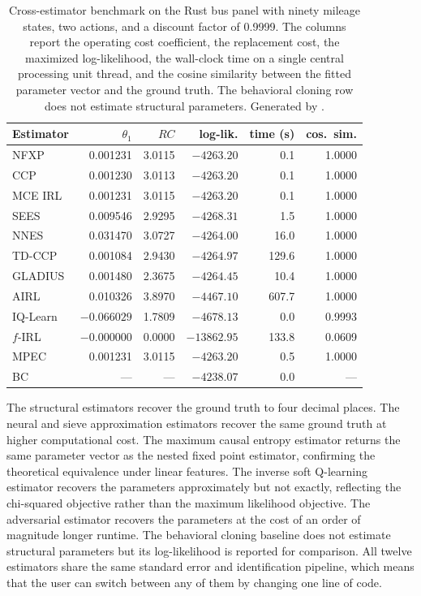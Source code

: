 \begin{table}[t]
\centering
\small
\begin{tabular}{lrrrrr}
\toprule
Estimator & $\theta_1$ & $RC$ & log-lik. & time (s) & cos.\ sim. \\
\midrule
NFXP    & 0.001231 & 3.0115 & $-4263.20$ &   0.1 & 1.0000 \\
CCP     & 0.001230 & 3.0113 & $-4263.20$ &   0.1 & 1.0000 \\
MCE IRL & 0.001231 & 3.0115 & $-4263.20$ &   0.1 & 1.0000 \\
SEES    & 0.009546 & 2.9295 & $-4268.31$ &   1.5 & 1.0000 \\
NNES    & 0.031470 & 3.0727 & $-4264.00$ &  16.0 & 1.0000 \\
TD-CCP  & 0.001084 & 2.9430 & $-4264.97$ & 129.6 & 1.0000 \\
GLADIUS & 0.001480 & 2.3675 & $-4264.45$ &  10.4 & 1.0000 \\
AIRL    & 0.010326 & 3.8970 & $-4467.10$ & 607.7 & 1.0000 \\
IQ-Learn& $-0.066029$ & 1.7809 & $-4678.13$ & 0.0 & 0.9993 \\
$f$-IRL & $-0.000000$ & 0.0000 & $-13862.95$ & 133.8 & 0.0609 \\
MPEC    & 0.001231 & 3.0115 & $-4263.20$ &   0.5 & 1.0000 \\
BC      & --- & --- & $-4238.07$ &   0.0 & --- \\
\bottomrule
\end{tabular}
\caption{Cross-estimator benchmark on the Rust bus panel with ninety mileage states, two actions, and a discount factor of 0.9999. The columns report the operating cost coefficient, the replacement cost, the maximized log-likelihood, the wall-clock time on a single central processing unit thread, and the cosine similarity between the fitted parameter vector and the ground truth. The behavioral cloning row does not estimate structural parameters. Generated by .}
\label{tab:bench}
\end{table}

The structural estimators recover the ground truth to four decimal places. The neural and sieve approximation estimators recover the same ground truth at higher computational cost. The maximum causal entropy estimator returns the same parameter vector as the nested fixed point estimator, confirming the theoretical equivalence under linear features. The inverse soft Q-learning estimator recovers the parameters approximately but not exactly, reflecting the chi-squared objective rather than the maximum likelihood objective. The adversarial estimator recovers the parameters at the cost of an order of magnitude longer runtime. The behavioral cloning baseline does not estimate structural parameters but its log-likelihood is reported for comparison. All twelve estimators share the same standard error and identification pipeline, which means that the user can switch between any of them by changing one line of code.
